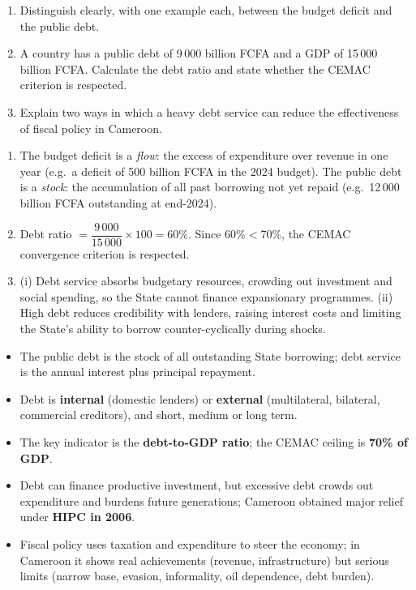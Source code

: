 \documentclass[11pt]{article}
\newcommand{\cle}[1]{{\popxbold\color{popdark}#1}}
\begin{document}
\begin{exercice}
\begin{enumerate}
\item Distinguish clearly, with one example each, between the budget deficit and the public debt.
\item A country has a public debt of 9\,000 billion FCFA and a GDP of 15\,000 billion FCFA. Calculate the debt ratio and state whether the CEMAC criterion is respected.
\item Explain two ways in which a heavy debt service can reduce the effectiveness of fiscal policy in Cameroon.
\end{enumerate}
\end{exercice}

\begin{corrige}[Exercise 1]
\begin{enumerate}
\item The budget deficit is a \emph{flow}: the excess of expenditure over revenue in one year (e.g.\ a deficit of 500 billion FCFA in the 2024 budget). The public debt is a \emph{stock}: the accumulation of all past borrowing not yet repaid (e.g.\ 12\,000 billion FCFA outstanding at end-2024).
\item Debt ratio $= \dfrac{9\,000}{15\,000}\times 100 = 60\%$. Since $60\% < 70\%$, the CEMAC convergence criterion is respected.
\item (i) Debt service absorbs budgetary resources, crowding out investment and social spending, so the State cannot finance expansionary programmes. (ii) High debt reduces credibility with lenders, raising interest costs and limiting the State's ability to borrow counter-cyclically during shocks.
\end{enumerate}
\end{corrige}

\begin{aretenir}
\begin{itemize}
\item The \cle{public debt} is the stock of all outstanding State borrowing; \cle{debt service} is the annual interest plus principal repayment.
\item Debt is \textbf{internal} (domestic lenders) or \textbf{external} (multilateral, bilateral, commercial creditors), and short, medium or long term.
\item The key indicator is the \textbf{debt-to-GDP ratio}; the CEMAC ceiling is \textbf{70\% of GDP}.
\item Debt can finance productive investment, but excessive debt crowds out expenditure and burdens future generations; Cameroon obtained major relief under \textbf{HIPC in 2006}.
\item \cle{Fiscal policy} uses taxation and expenditure to steer the economy; in Cameroon it shows real achievements (revenue, infrastructure) but serious limits (narrow base, evasion, informality, oil dependence, debt burden).
\end{itemize}
\end{aretenir}
\end{document}
